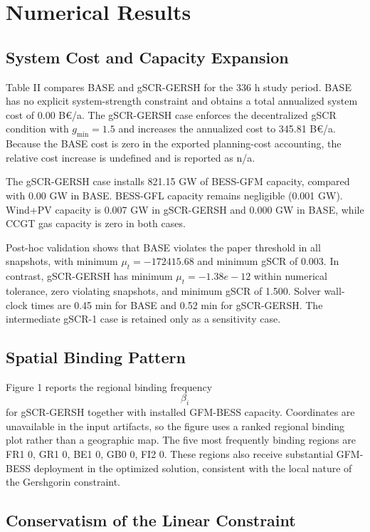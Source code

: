 \section{Numerical Results}
\label{sec:results}

\subsection{System Cost and Capacity Expansion}

Table II compares BASE and gSCR-GERSH for the 336 h study period. BASE has no explicit system-strength constraint and obtains a total annualized system cost of 0.00 B€/a. The gSCR-GERSH case enforces the decentralized gSCR condition with $g_{\min}=1.5$ and increases the annualized cost to 345.81 B€/a. Because the BASE cost is zero in the exported planning-cost accounting, the relative cost increase is undefined and is reported as n/a.

The gSCR-GERSH case installs 821.15 GW of BESS-GFM capacity, compared with 0.00 GW in BASE. BESS-GFL capacity remains negligible (0.001 GW). Wind+PV capacity is 0.007 GW in gSCR-GERSH and 0.000 GW in BASE, while CCGT gas capacity is zero in both cases.

Post-hoc validation shows that BASE violates the paper threshold in all snapshots, with minimum $\mu_t = -172415.68$ and minimum gSCR of 0.003. In contrast, gSCR-GERSH has minimum $\mu_t = -1.38e-12$ within numerical tolerance, zero violating snapshots, and minimum gSCR of 1.500. Solver wall-clock times are 0.45 min for BASE and 0.52 min for gSCR-GERSH. The intermediate gSCR-1 case is retained only as a sensitivity case.

\subsection{Spatial Binding Pattern}

Figure 1 reports the regional binding frequency $$\beta_i$$ for gSCR-GERSH together with installed GFM-BESS capacity. Coordinates are unavailable in the input artifacts, so the figure uses a ranked regional binding plot rather than a geographic map. The five most frequently binding regions are FR1 0, GR1 0, BE1 0, GB0 0, FI2 0. These regions also receive substantial GFM-BESS deployment in the optimized solution, consistent with the local nature of the Gershgorin constraint.

\subsection{Conservatism of the Linear Constraint}

